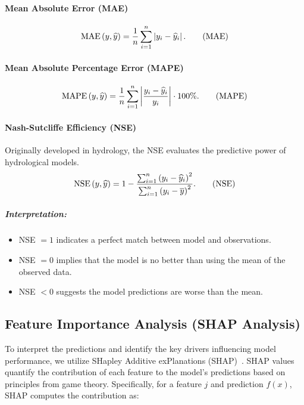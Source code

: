 \paragraph{Mean Absolute Error (MAE)}
\begin{equation}
    \operatorname{MAE}{\left(y, \widehat{y}\right)} = \frac{1}{n} \sum_{i=1}^{n} \left|y_i - \widehat{y}_i\right|.
    \label{metric:mae}
    \tag{MAE}
\end{equation}

\paragraph{Mean Absolute Percentage Error (MAPE)}
\begin{equation}
    \operatorname{MAPE}{\left(y, \widehat{y}\right)}
    = \frac{1}{n} \sum_{i=1}^{n} \left| \frac{y_i - \widehat{y}_i}{y_i} \right| \cdot 100\%.
    \label{metric:mape}
    \tag{MAPE}
\end{equation}

\paragraph{Nash-Sutcliffe Efficiency (NSE)}
Originally developed in hydrology, the NSE evaluates the predictive power of hydrological models.
\begin{equation}
    \operatorname{NSE}{\left(y, \widehat{y}\right)} = 1 - \frac{\sum_{i=1}^{n} \left( y_i - \widehat{y}_i \right)^2}{\sum_{i=1}^{n} \left( y_i - \overline{y} \right)^2}.
    \label{metric:nse}
    \tag{NSE}
\end{equation}

\subparagraph{Interpretation:}
\begin{itemize}
    \item NSE \( = 1 \) indicates a perfect match between model and observations.
    \item NSE \( = 0 \) implies that the model is no better than using the mean of the observed data.
    \item NSE \( < 0 \) suggests the model predictions are worse than the mean.
\end{itemize}


\subsection{Feature Importance Analysis (SHAP Analysis)}

To interpret the predictions and identify the key drivers influencing model performance, we utilize SHapley Additive exPlanations (SHAP)~\cite{lundbergUnifiedApproachInterpreting2017}. SHAP values quantify the contribution of each feature to the model’s predictions based on principles from game theory. Specifically, for a feature $j$ and prediction $f(x)$, SHAP computes the contribution as:

